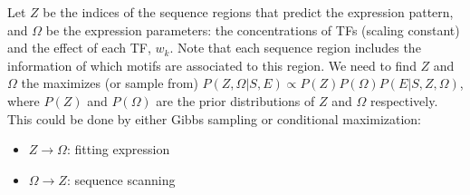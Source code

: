 \documentclass[11pt]{article}
\begin{document}
\begin{enumerate}
\begin{enumerate}
Let $Z$ be the indices of the sequence regions that predict the expression pattern, and $\Omega$ be the expression parameters: the concentrations of TFs (scaling constant) and the effect of each TF, $w_k$. Note that each sequence region includes the information of which motifs are associated to this region. We need to find $Z$ and $\Omega$ the maximizes (or sample from) $P(Z,\Omega|S,E) \propto P(Z) P(\Omega) P(E|S,Z,\Omega)$, where $P(Z)$ and $P(\Omega)$ are the prior distributions of $Z$ and $\Omega$ respectively. This could be done by either Gibbs sampling or conditional maximization: 
\begin{itemize}
\item $Z \rightarrow \Omega$: fitting expression 
\item $\Omega \rightarrow Z$: sequence scanning
\end{itemize} 

\end{enumerate}


\end{enumerate}
\end{document}
